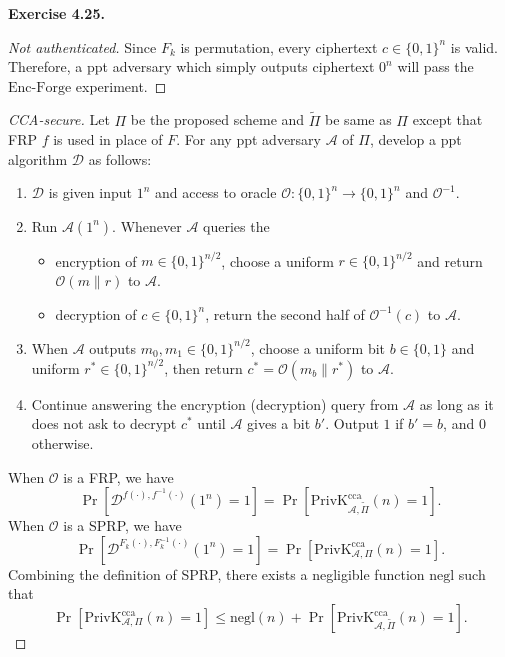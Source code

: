 \documentclass[a4paper]{article}
\newtheorem*{proof}{Proof}
\newenvironment{exercise}[1]{
	\par
	\noindent\textbf{Exercise #1.}\quad
}{
	\par
	\bigskip
}
\newcommand{\sbra}[1]{\left[ #1 \right]}
\newcommand{\bin}{\{0,1\}}
\newcommand{\PrivK}{\mathrm{PrivK}}
\newcommand{\Encforge}{\mathrm{Enc}\text{-}\mathrm{Forge}}
\newcommand{\negl}{\mathrm{negl}}
\newcommand{\ppt}{{\sc ppt} }
\newcommand{\cca}{\mathrm{cca}}
\begin{document}
\begin{exercise}{4.25}

\begin{proof}[Not authenticated]
    Since $F_k$ is permutation, every ciphertext $c\in\bin^n$ is valid.
    Therefore, a \ppt adversary which simply outputs ciphertext $0^n$ will pass the $\Encforge$ experiment.
\end{proof}

\begin{proof}[CCA-secure]
    Let $\Pi$ be the proposed scheme and $\widetilde\Pi$
    be same as $\Pi$ except that FRP $f$ is used in place of $F$.
    For any \ppt adversary $\mathcal A$ of $\Pi$, develop a \ppt algorithm $\mathcal D$ as follows:
    \begin{enumerate}
        \item $\mathcal D$ is given input $1^n$ and access to oracle $\mathcal O:\bin^n\to\bin^n$ and 
            $\mathcal O^{-1}$.
        \item Run $\mathcal A(1^n)$. Whenever $\mathcal A$ queries the 
            \begin{itemize}
                \item encryption of $m\in\bin^{n/2}$, 
                    choose a uniform $r\in\bin^{n/2}$ and return $\mathcal O(m\|r)$ to $\mathcal A$.
                \item decryption of $c\in\bin^{n}$, 
                    return the second half of $\mathcal O^{-1}(c)$ to $\mathcal A$.
            \end{itemize}
        \item When $\mathcal A$ outputs $m_0,m_1\in\bin^{n/2}$, choose a uniform bit $b\in\bin$ and
            uniform $r^*\in\bin^{n/2}$, then return $c^*=\mathcal O(m_b\|r^*)$ to $\mathcal A$.
        \item Continue answering the encryption (decryption) query from $\mathcal A$ as long as it does not ask to
            decrypt $c^*$ until $\mathcal A$ gives a bit $b'$.
            Output $1$ if $b'=b$, and $0$ otherwise.
    \end{enumerate}
    When $\mathcal O$ is a FRP, we have
        $$
        \Pr\sbra{\mathcal D^{f(\cdot),f^{-1}(\cdot)}(1^n)=1}=\Pr\sbra{\PrivK_{\mathcal A,\widetilde\Pi}^\cca(n)=1}.
        $$
    When $\mathcal O$ is a SPRP, we have
        $$
        \Pr\sbra{\mathcal D^{F_k(\cdot),F_k^{-1}(\cdot)}(1^n)=1}=\Pr\sbra{\PrivK_{\mathcal A,\Pi}^\cca(n)=1}.
        $$
    Combining the definition of SPRP, there exists a negligible function $\negl$ such that
    $$
        \Pr\sbra{\PrivK_{\mathcal A,\Pi}^\cca(n)=1}\leq\negl(n)+\Pr\sbra{\PrivK_{\mathcal A,\widetilde\Pi}^\cca(n)=1}.
    $$


\end{proof}
\end{exercise}
\end{document}
